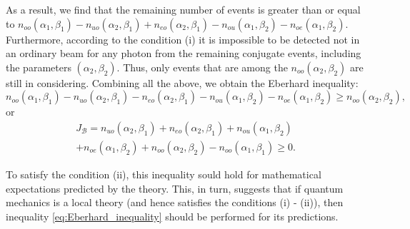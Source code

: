 \documentclass[%
master,         %
subf,           %
href,           %
colorlinks=true %
]{disser}
\numberwithin{equation}{section}
\numberwithin{figure}{section}
\begin{document}
As a result, we find that the remaining number of events is greater than or equal to $ n_{oo} (\alpha_1, \beta_1) - n_{uo} (\alpha_2, \beta_1) + n_{eo} (\alpha_2, \beta_1) - n_{ou} (\alpha_1, \beta_2) - n_{oe} (\alpha_1, \beta_2) $. Furthermore, according to the condition (i) it is impossible to be detected not in an ordinary beam for any photon from the remaining conjugate events, including the parameters $ (\alpha_2, \beta_2) $. Thus, only events that are among the $n_{oo}(\alpha_2, \beta_2)$ are still in considering. Combining all the above, we obtain the Eberhard inequality:
\[
n_{oo}(\alpha_1, \beta_1) - n_{uo}(\alpha_2, \beta_1) - n_{eo}(\alpha_2, \beta_1) - n_{ou}(\alpha_1, \beta_2) - n_{oe}(\alpha_1, \beta_2) \geq n_{oo}(\alpha_2, \beta_2),
\]
or
\begin{multline}
J_{\mathcal{B}} = n_{uo}(\alpha_2, \beta_1) + n_{eo}(\alpha_2, \beta_1) + n_{ou}(\alpha_1, \beta_2) \\
+ n_{oe}(\alpha_1, \beta_2) + n_{oo}(\alpha_2, \beta_2) - n_{oo}(\alpha_1, \beta_1) \geq 0.
\label{eq:Eberhard_inequality}
\end{multline}

To satisfy the condition (ii), this inequality sould hold for mathematical expectations predicted by the theory. This, in turn, suggests that if quantum mechanics is a local theory (and hence satisfies the conditions (i) - (ii)), then inequality \eqref{eq:Eberhard_inequality} should be performed for its predictions.
\end{document}
